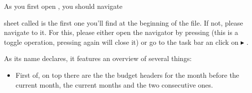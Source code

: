 As you first open \tfn, you should navigate 

sheet called  is the first one you'll find at the beginning of the file.
If not, please navigate to it.
For this, please either open the navigator by pressing  (this is a toggle operation, pressing  again will close it) or go to the task bar an click on  \( \blacktriangleright \) .

As its name declares, it features an overview of several things:
\begin{itemize}
	\item First of, on top there are the the budget headers for the month before the current month, the current months and the two consecutive ones.
\end{itemize}

